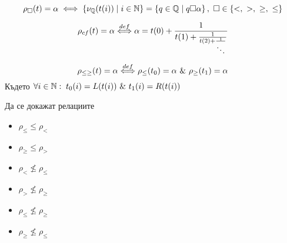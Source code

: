\begin{definition}
    \begin{equation}
        \rho_\square(t) = \alpha \iff \left\{ \nu_{\mathbb{Q}}(t(i)) \mid i \in {\mathbb{N}} \right\} =  \left\{ q \in {\mathbb{Q}} \mid q \square \alpha \right\},\ \square \in \{<,\ >,\ \geq,\ \leq\}
    \end{equation}
\end{definition}
\begin{definition}
    \begin{equation}
        \rho_{cf}(t) = \alpha {\overset{def}{\iff}} \alpha = t(0) + \frac{1}{t(1) + \frac{1}{t(2) + \frac{1}{\ddots}}}
    \end{equation}
\end{definition}
\begin{definition}
    \begin{equation}
        \rho_{\leq\geq}(t) = \alpha {\overset{def}{\iff}} \rho_\leq(t_0) = \alpha\ \&\ \rho_\geq(t_1) = \alpha
    \end{equation}
    Където $\forall i \in \N:\; t_0(i) = L(t(i))\ \&\ t_1(i) = R(t(i))$
\end{definition}
\begin{problem}
Да се докажат релациите
\begin{itemize}
    \item $\rho_\leq \leq \rho_<$
    \item $\rho_\geq \leq \rho_>$
    \item $\rho_< \not\leq \rho_\leq$
    \item $\rho_> \not\leq \rho_\geq$
    \item $\rho_\leq \not\leq \rho_\geq$
    \item $\rho_\geq \not\leq \rho_\leq$
\end{itemize}
\end{problem}
